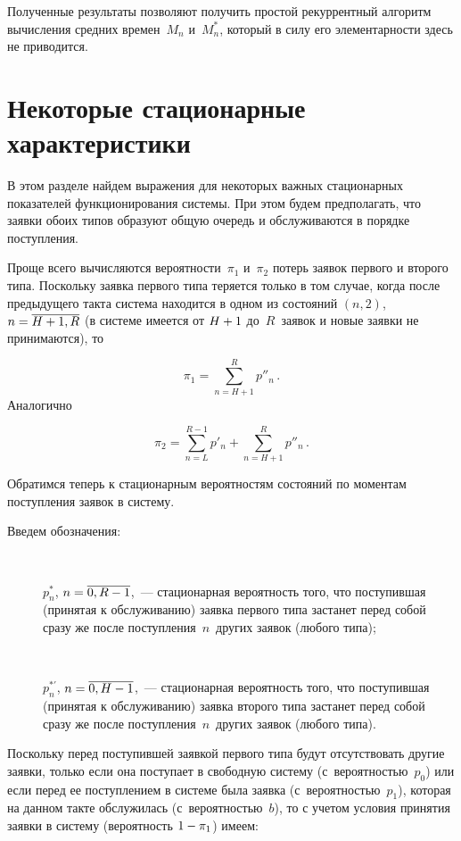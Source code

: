 \begin{multicols}{2}
Полученные результаты позволяют получить простой
рекуррентный алгоритм вычисления средних времен~$M_n$ и~$M^*_n$,
который в силу его элементарности здесь не приводится.

\section{Некоторые стационарные характеристики}

В этом разделе найдем выражения для некоторых
важных стационарных показателей функционирования системы.
При этом будем предполагать, что заявки обоих типов
образуют общую очередь и обслуживаются в порядке поступления.

Проще всего вычисляются вероятности~$\pi_1$ и~$\pi_2$ потерь
заявок первого и второго типа. Поскольку заявка первого типа теряется только в том
случае, когда после предыдущего такта система находится в одном из состояний
$(n,2)$, $n\hm=\overline{H+1,R}$ (в системе имеется от $H\hm+1$ до~$R$~заявок и новые
заявки не принимаются), то

\noindent
$$
\pi_1 = \sum\limits_{n=H+1}^{R} p''_{n}\,.
$$
Аналогично

\noindent
$$
\pi_2 = \sum\limits_{n=L}^{R-1} p'_{n} + \sum\limits_{n=H+1}^{R} p''_{n}\,.
$$

Обратимся теперь к стационарным вероятностям
состояний по моментам поступления заявок в систему.

Введем обозначения:
\begin{description}
\item[\,]
$p^*_n$, $n\hm=\overline{0,R-1}$,~--- стационарная
вероятность того, что поступившая (принятая к
обслуживанию) заявка первого типа застанет перед
собой сразу же после поступления~$n$~других заявок (любого типа);
\item[\,]
$p^{*\prime}_n$, $n\hm=\overline{0,H-1}$,~---
стационарная вероятность того, что поступившая (принятая к
обслуживанию) заявка второго типа застанет перед
собой сразу же после поступления~$n$~других заявок (любого типа).
\end{description}

Поскольку перед поступившей заявкой первого типа
будут отсутствовать другие заявки, только если она поступает
в свободную систему (с~ве\-ро\-ят\-ностью~$p_{0}$)
или если перед ее поступлением в системе была
заявка (с~вероятностью~$p_{1}$), которая на данном
такте обслужилась (с~вероятностью~$b$), то с
учетом условия принятия заявки в систему
(вероятность $1\hm-\pi_1$) имеем:


\end{multicols}
